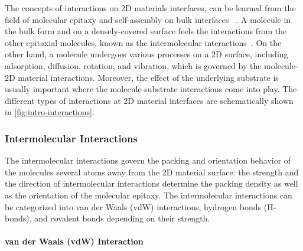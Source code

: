 The concepts of interactions on 2D materials interfaces, can be
learned from the field of molecular epitaxy and self-assembly on bulk
interfaces
~\cite{Kowarik_2008_rev_MBE,Barth_2007,Whitesides_2002_assem_rev,Philips_2D_assem_book}.
% 
A molecule in the bulk
form and on a densely-covered surface feels the interactions from the
other epitaxial molecules, known as the intermolecular
interactions~.
%
On the other hand, a molecule undergoes various
processes on a 2D surface, including adsorption, diffusion, rotation,
and vibration, which is governed by the molecule-2D material
interactions.
%
Moreover, the effect of the underlying substrate is
usually important where the molecule-substrate interactions come into
play.
%
The different types of interactions at 2D material interfaces are
schematically shown in \autoref{fig:intro-interactions}.

\subsubsection{Intermolecular Interactions}
\label{sec:intro-inter-mole}

The intermolecular interactions govern the packing and orientation
behavior of the molecules several atoms away from the 2D material
surface: the strength and the direction of intermolecular interactions
determine the packing density as well as the orientation of the
molecular epitaxy. The intermolecular interactions can be categorized 
into van der Waals (vdW) interactions, hydrogen bonds (H-bonds), and
covalent bonds depending on their strength. 

\paragraph{van der Waals (vdW) Interaction}

